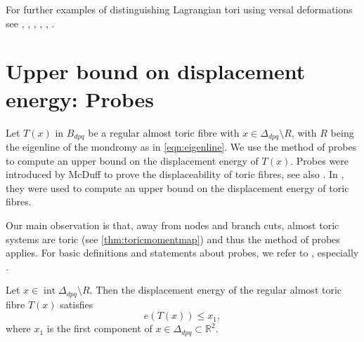 \documentclass[12pt,a4paper,draft]{scrartcl}
\begin{document}
For further examples of distinguishing Lagrangian tori using versal deformations see \cite{Che96}, \cite{CheSch10}, \cite{chekanovschlenk2015}, \cite{brendel2020real}, \cite{brendel2023hamiltonian}, \cite{brendel2023local}.

\section{Upper bound on displacement energy: Probes}
\label{sec:upper_bound}

Let $T(x)$ in $B_{dpq}$ be a regular almost toric fibre with $x \in \Delta_{dpq} \setminus R$, with $R$ being the eigenline of the mondromy as in \eqref{eqn:eigenline}. We use the method of probes to compute an upper bound on the displacement energy of $T(x)$. Probes were introduced by McDuff \cite{mcduff2011displacing} to prove the displaceability of toric fibres, see also \cite{AbrBorMcD14}. In \cite{brendel2020real}, they were used to compute an upper bound on the displacement energy of toric fibres.

Our main observation is that, away from nodes and branch cuts, almost toric systems are toric (see \cref{thm:toricmomentmap}) and thus the method of probes applies.
For basic definitions and statements about probes, we refer to \cite{mcduff2011displacing}, especially \cite[Definition 2.3, Lemma 2.4]{mcduff2011displacing}.


\begin{lemma}
    \label{thm:upper_bound}
    Let $x \in \operatorname{int} \Delta_{dpq} \setminus R$. Then the displacement energy of the regular almost toric fibre $T(x)$ satisfies
    \[ e(T(x))\leq x_1, \]
    where $x_1$ is the first component of $x \in \Delta_{dpq} \subset \mathbb{R}^2$.
\end{lemma}
\end{document}
